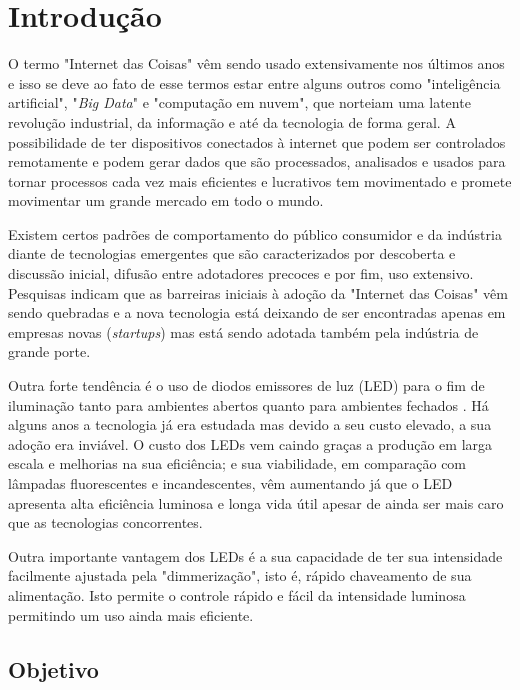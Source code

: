 \chapter{Introdução}

O termo "Internet das Coisas" \space vêm sendo usado extensivamente nos últimos anos e isso se deve ao fato de esse termos estar entre alguns outros como "inteligência artificial", "\textit{Big Data}" \space e "computação em nuvem", que norteiam uma latente revolução industrial, da informação e até da tecnologia de forma geral. A possibilidade de ter dispositivos conectados à internet que podem ser controlados remotamente e podem gerar dados que são processados, analisados e usados para tornar processos cada vez mais eficientes e lucrativos tem movimentado e promete movimentar um grande mercado em todo o mundo. 

Existem certos padrões de comportamento do público consumidor e da indústria diante de  tecnologias emergentes que são caracterizados por descoberta e discussão inicial, difusão entre adotadores precoces e por fim, uso extensivo. Pesquisas \cite{forbes} indicam que as barreiras iniciais à adoção da "Internet das Coisas" vêm sendo quebradas e a nova tecnologia está deixando de ser encontradas apenas em empresas novas (\textit{startups}) mas está sendo adotada também pela indústria de grande porte. 

Outra forte tendência é o uso de diodos emissores de luz (LED) para o fim de iluminação tanto para ambientes abertos quanto para ambientes fechados \cite{bndes}. Há alguns anos a tecnologia já era estudada mas devido a seu custo elevado, a sua adoção era inviável. O custo dos LEDs vem caindo graças a produção em larga escala e melhorias na sua eficiência; e sua viabilidade, em comparação com lâmpadas fluorescentes e incandescentes, vêm aumentando já que o LED apresenta alta eficiência luminosa e longa vida útil apesar de ainda ser mais caro que as tecnologias concorrentes.

Outra importante vantagem dos LEDs é a sua capacidade de ter sua intensidade facilmente ajustada pela "dimmerização", isto é, rápido chaveamento de sua alimentação. Isto permite o controle rápido e fácil da intensidade luminosa permitindo um uso ainda mais eficiente.

\section{Objetivo}

